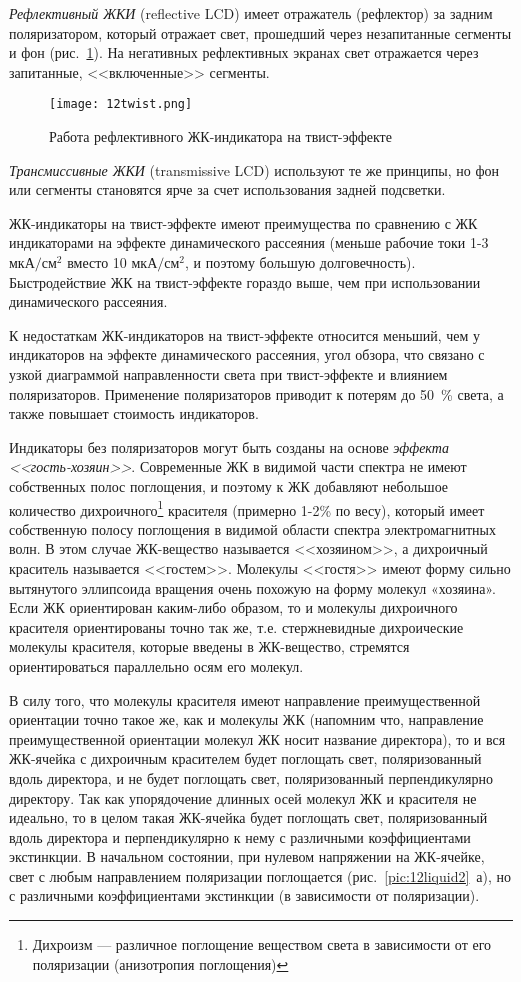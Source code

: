 \textit{Рефлективный ЖКИ} (reflective LCD) имеет отражатель (рефлектор) за задним поляризатором, который отражает свет, прошедший через незапитанные сегменты и фон (рис.~\ref{pic:12twist}). На негативных рефлективных экранах свет отражается через запитанные, <<включенные>> сегменты. 

\begin{figure}[h!]
	\caption{ Работа рефлективного ЖК-индикатора на твист-эффекте }
	\texttt{[image: 12twist.png]}
	\label{pic:12twist}
\end{figure}

\textit{Трансмиссивные ЖКИ} (transmissive LCD) используют те же принципы, но фон или сегменты становятся ярче за счет использования задней подсветки.

ЖК-индикаторы на твист-эффекте имеют преимущества по сравнению с ЖК индикаторами на эффекте динамического рассеяния (меньше рабочие токи 1-3 $ \text{мкА}/\text{см}^2 $ вместо 10 $ \text{мкА}/\text{см}^2 $, и поэтому большую долговечность). Быстродействие ЖК на твист-эффекте гораздо выше, чем при использовании динамического рассеяния.

К недостаткам ЖК-индикаторов на твист-эффекте относится меньший, чем у индикаторов на эффекте динамического рассеяния, угол обзора, что связано с узкой диаграммой направленности света при твист-эффекте и влиянием поляризаторов. Применение поляризаторов приводит к потерям до 50~\% света, а также повышает стоимость индикаторов.

Индикаторы без поляризаторов могут быть созданы на основе \textit{эффекта <<гость-хозяин>>}. Современные ЖК в видимой части спектра не имеют собственных полос поглощения, и поэтому к ЖК добавляют небольшое количество дихроичного\footnote{Дихроизм --- различное поглощение веществом света в зависимости от его поляризации (анизотропия поглощения)} красителя (примерно 1-2\% по весу), который имеет собственную полосу поглощения в видимой области спектра электромагнитных волн. В этом случае ЖК-вещество называется <<хозяином>>, а дихроичный краситель называется <<гостем>>. Молекулы <<гостя>> имеют форму сильно вытянутого эллипсоида вращения очень похожую на форму молекул «хозяина». Если ЖК ориентирован каким-либо образом, то и молекулы дихроичного красителя ориентированы точно так же, т.е. стержневидные дихроические молекулы красителя, которые введены в ЖК-вещество, стремятся ориентироваться параллельно осям его молекул. 

В силу того, что молекулы красителя имеют направление преимущественной ориентации точно такое же, как и молекулы ЖК (напомним что, направление преимущественной ориентации молекул ЖК носит название директора), то и вся ЖК-ячейка с дихроичным красителем будет поглощать свет, поляризованный вдоль директора, и не будет поглощать свет, поляризованный перпендикулярно директору. Так как упорядочение длинных осей молекул ЖК и красителя не идеально, то в целом такая ЖК-ячейка будет поглощать свет, поляризованный вдоль директора и перпендикулярно к нему с различными коэффициентами экстинкции. В начальном состоянии, при нулевом напряжении на ЖК-ячейке, свет с любым направлением поляризации поглощается (рис.~\ref{pic:12liquid2}~а), но с различными коэффициентами экстинкции (в зависимости от поляризации).

